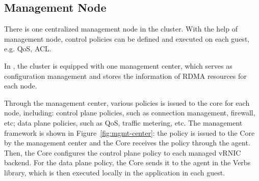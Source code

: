 \subsection{Management Node}

There is one centralized management node in the cluster. With the help of management node, control policies can be defined and executed on each guest, e.g. QoS, ACL.


In \sys, the cluster is equipped with one management center, which serves as configuration management and stores the information of RDMA resources for each node.


Through the management center, various policies is issued to the \sys core for each node, including: control plane policies, such as connection management, firewall, etc; data plane policies, such as QoS, traffic metering, etc. The management framework is shown in Figure~\ref{fig:mgmt-center}: the policy is issued to the \sys Core by the management center and the \sys Core receives the policy through the agent. Then, the \sys Core configures the control plane policy to each managed vRNIC backend. For the data plane policy, the \sys Core sends it to the agent in the Verbs library, which is then executed locally in the application in each guest.


